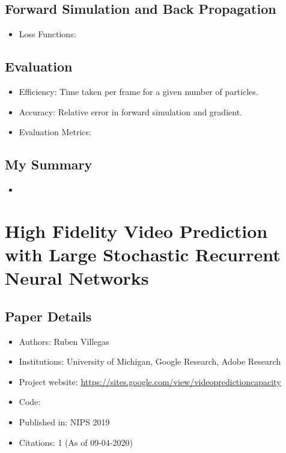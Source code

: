 \documentclass{article}
\begin{document}
    \subsection{Forward Simulation and Back Propagation}\label{subsec:ChainQueen_A_Real_Time_Differentiable_Physical_Simulator_for_Soft_Robotics:forward-simulation-and-back-propagation}
    \begin{itemize}
        \item Loss Functions:
    \end{itemize}

    \subsection{Evaluation}\label{subsec:ChainQueen_A_Real_Time_Differentiable_Physical_Simulator_for_Soft_Robotics:evaluation}
    \begin{itemize}
        \item Efficiency: Time taken per frame for a given number of particles.
        \item Accuracy: Relative error in forward simulation and gradient.
        \item Evaluation Metrics:
    \end{itemize}

    \subsection{My Summary}\label{subsec:ChainQueen_A_Real_Time_Differentiable_Physical_Simulator_for_Soft_Robotics:my-summary}
    \begin{itemize}
        \item
    \end{itemize}
    \newpage


    \section{High Fidelity Video Prediction with Large Stochastic Recurrent Neural Networks}\label{sec:High_Fidelity_Video_Prediction_with_Large_Stochastic_Recurrent_Neural_Networks}
    \subsection*{Paper Details}
    \begin{itemize}
        \item Authors: Ruben Villegas
        \item Institutions: University of Michigan, Google Research, Adobe Research
        \item Project website: \url{https://sites.google.com/view/videopredictioncapacity}
        \item Code:
        \item Published in: NIPS 2019
        \item Citations: 1 (As of 09-04-2020)
    \end{itemize}
\end{document}
